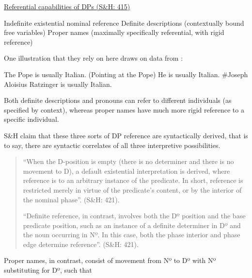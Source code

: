 \documentclass[output=paper
,modfonts
,nonflat
]{langsci/langscibook}
\begin{document}
\ea \underline{Referential capabilities of DPs (S\&H: 415)}

\begin{xlist}
\ex Indefinite existential nominal reference 
\ex Definite descriptions (contextually bound free variables)
\ex Proper names (maximally specifically referential, with rigid reference)

\end{xlist}

\z

\noindent One illustration that they rely on here draws on data from \citet{Elbourne:2008}: 

\ea	

\begin{xlist}
\ex The Pope is usually Italian.
\ex (Pointing at the Pope) He is usually Italian.
\ex \#Joseph Aloisius Ratzinger is usually Italian.
\end{xlist}

\z
\noindent Both definite descriptions and pronouns can refer to different individuals (as specified by context), whereas proper names have much more rigid reference to a specific individual. 

S\&H claim that these three sorts of DP reference are syntactically derived, that is to say, there are syntactic correlates of all three interpretive possibilities. 

\begin{quote}
``When the D-position is empty (there is no determiner and there is no movement to D), a default existential interpretation is derived, where reference is to an arbitrary instance of the predicate. In short, reference is restricted merely in virtue of the predicate’s content, or by the interior of the nominal phase''. (S\&H: 421).  

``Definite reference, in contrast, involves both the Dº position and the base predicate position, such as an instance of a definite determiner in Dº and the noun occurring in Nº. In this case, both the phase interior and phase edge determine reference”. (S\&H: 421). 

\end{quote}
\noindent Proper names, in contrast, consist of movement from Nº to Dº with Nº substituting for Dº, such that 
\end{document}
